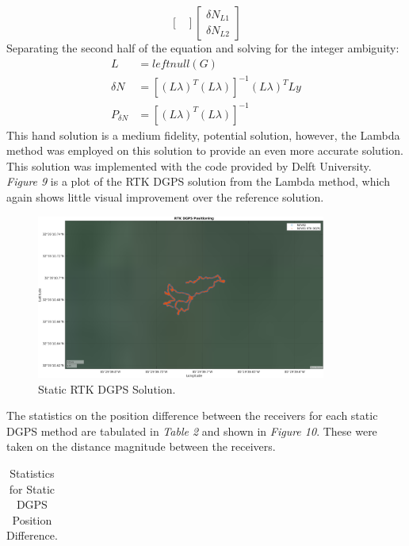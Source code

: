 \documentclass[11pt]{article}
\begin{document}
\begin{enumerate}[label=\textbf{\arabic*.}]
\begin{equation}
\begin{bmatrix}
      \end{bmatrix}
      \begin{bmatrix}
        \delta N_{L1} \\ \delta N_{L2}
      \end{bmatrix}
    \end{equation}
    Separating the second half of the equation and solving for the integer ambiguity:
    \begin{equation}
      \begin{split}
        L &= leftnull(G) \\
        \delta N &= [(L\lambda)^T(L\lambda)]^{-1}(L\lambda)^T Ly \\
        P_{\delta N} &= [(L\lambda)^T(L\lambda)]^{-1}
      \end{split}
    \end{equation}
    This hand solution is a medium fidelity, potential solution, however, the Lambda method 
    was employed on this solution to provide an even more accurate solution. This solution 
    was implemented with the code provided by Delft University. \emph{Figure 9} is a plot of 
    the RTK DGPS solution from the Lambda method, which again shows little visual improvement 
    over the reference solution.
    \begin{figure}[H]
      \centering
      \includegraphics[width=0.85\textwidth]{p2_d.png}
      \caption{Static RTK DGPS Solution.}
    \end{figure}
    The statistics on the position difference between the receivers for each static DGPS method 
    are tabulated in \emph{Table 2} and shown in \emph{Figure 10}. These were taken on the 
    distance magnitude between the receivers.
    \begin{table}[H]
      \centering
      \caption{Statistics for Static DGPS Position Difference.}
      \begin{tabular}{ P{5cm}|P{3cm} P{3cm} }

\end{tabular}
\end{table}
\end{enumerate}
\end{document}
